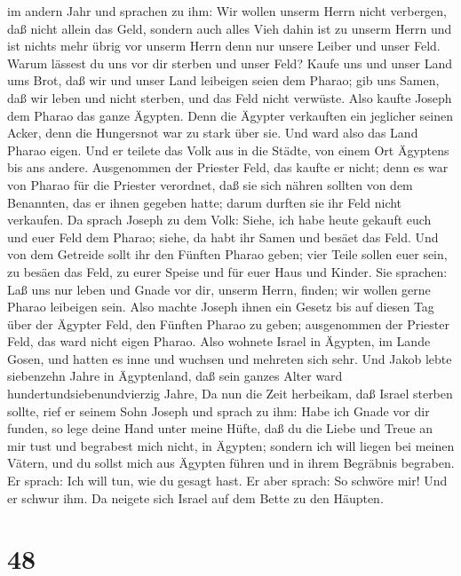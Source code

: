 im andern Jahr und sprachen zu ihm: Wir wollen unserm Herrn nicht
verbergen, daß nicht allein das Geld, sondern auch alles Vieh dahin ist
zu unserm Herrn und ist nichts mehr übrig vor unserm Herrn denn nur
unsere Leiber und unser Feld.  Warum lässest du uns vor dir
sterben und unser Feld? Kaufe uns und unser Land ums Brot, daß wir und
unser Land leibeigen seien dem Pharao; gib uns Samen, daß wir leben und
nicht sterben, und das Feld nicht verwüste.  Also kaufte
Joseph dem Pharao das ganze Ägypten. Denn die Ägypter verkauften ein
jeglicher seinen Acker, denn die Hungersnot war zu stark über sie. Und
ward also das Land Pharao eigen.  Und er teilete das Volk
aus in die Städte, von einem Ort Ägyptens bis ans andere. 
Ausgenommen der Priester Feld, das kaufte er nicht; denn es war von
Pharao für die Priester verordnet, daß sie sich nähren sollten von dem
Benannten, das er ihnen gegeben hatte; darum durften sie ihr Feld nicht
verkaufen.  Da sprach Joseph zu dem Volk: Siehe, ich habe
heute gekauft euch und euer Feld dem Pharao; siehe, da habt ihr Samen
und besäet das Feld.  Und von dem Getreide sollt ihr den
Fünften Pharao geben; vier Teile sollen euer sein, zu besäen das Feld,
zu eurer Speise und für euer Haus und Kinder.  Sie
sprachen: Laß uns nur leben und Gnade vor dir, unserm Herrn, finden; wir
wollen gerne Pharao leibeigen sein.  Also machte Joseph
ihnen ein Gesetz bis auf diesen Tag über der Ägypter Feld, den Fünften
Pharao zu geben; ausgenommen der Priester Feld, das ward nicht eigen
Pharao.  Also wohnete Israel in Ägypten, im Lande Gosen,
und hatten es inne und wuchsen und mehreten sich sehr.  Und
Jakob lebte siebenzehn Jahre in Ägyptenland, daß sein ganzes Alter ward
hundertundsiebenundvierzig Jahre,  Da nun die Zeit
herbeikam, daß Israel sterben sollte, rief er seinem Sohn Joseph und
sprach zu ihm: Habe ich Gnade vor dir funden, so lege deine Hand unter
meine Hüfte, daß du die Liebe und Treue an mir tust und begrabest mich
nicht, in Ägypten;  sondern ich will liegen bei meinen
Vätern, und du sollst mich aus Ägypten führen und in ihrem Begräbnis
begraben. Er sprach: Ich will tun, wie du gesagt hast.  Er
aber sprach: So schwöre mir! Und er schwur ihm. Da neigete sich Israel
auf dem Bette zu den Häupten.

\hypertarget{section-47}{%
\section{48}\label{section-47}}

